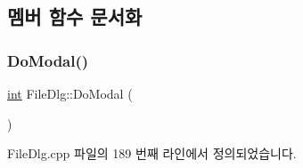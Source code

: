 \subsection{멤버 함수 문서화}
\mbox{\label{class_file_dlg_a45b5a0d6b2d8a9b973864ab2b36e16e0}} 
\subsubsection{\texorpdfstring{Do\+Modal()}{DoModal()}}
{\footnotesize\ttfamily \mbox{\hyperlink{_util_8cpp_a0ef32aa8672df19503a49fab2d0c8071}{int}} File\+Dlg\+::\+Do\+Modal (\begin{DoxyParamCaption}{ }\end{DoxyParamCaption})}



File\+Dlg.\+cpp 파일의 189 번째 라인에서 정의되었습니다.


